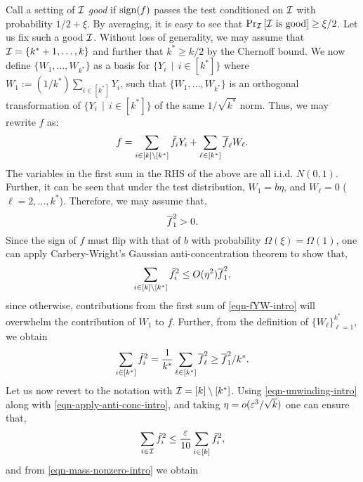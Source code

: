 Call a setting of $\mathcal{I}$ \emph{good} if $\textnormal{sign}(f)$ passes the test
conditioned on $\mathcal{I}$ with probability $1/2 + \xi$. By averaging,
it is easy to see that $\Pr_{\mathcal{I}}\left[\mathcal{I}\textnormal{ is good}\right] \geq
\xi/2$.  Let us fix such a good
$\mathcal{I}$. Without loss of generality, we may assume that $\mathcal{I} = \{k^* + 1, \dots, k\}$ and
further that $k^* \geq k/2$ by the Chernoff bound. We now define 
 $\{W_1, \dots, W_{k^*}\}$ as a basis for $\{Y_{i}\,\mid\,i \in [k^*]\}$
where $W_1 := (1/k^*)\sum_{i\in[k^*]} Y_{i}$, 
such that $\{W_1, \dots, W_{k^*}\}$ is an orthogonal
transformation of $\{Y_{i}\,\mid\,i \in [k^*]\}$ of the same $1/\sqrt{k^*}$ 
norm. 
Thus, we may rewrite $f$ as:
\begin{equation}\label{eqn-fYW-intro}
f = \sum_{i \in
[k]\setminus[k^*]}\tilde{f}_{i}Y_{i} + \sum_{\ell \in [k^*]}
\overline{f}_{\ell}W_\ell.
\end{equation} The variables in the first sum in the RHS of the
above are all i.i.d. $N(0,1)$. Further, it can be seen that under the
test distribution, $W_1 = b\eta$, and $W_\ell = 0$ ($\ell
= 2,\dots, k^*$). Therefore, we may assume that,
\begin{equation}
\overline{f}_1^2 > 0.\label{eqn-mass-nonzero-intro}
\end{equation}
Since the sign of $f$ must flip with that of $b$
with probability $\Omega(\xi) = \Omega(1)$, one can apply
Carbery-Wright's Gaussian
anti-concentration theorem to show that,
\begin{equation}\label{eqn-apply-anti-conc-intro}
\sum_{i \in
[k]\setminus[k^*]}\tilde{f}_{i}^2 \leq O(\eta^2)\overline{f}^2_{1}, 
\end{equation}
since otherwise, contributions from the first sum of \eqref{eqn-fYW-intro}  will 
overwhelm the contribution of $W_1$ to $f$.
Further, from the definition of $\{W_\ell\}_{\ell=1}^{k^*}$, we obtain
\begin{equation}
\sum_{i \in [k^*]}\tilde{f}_{i}^2 = \frac{1}{k^*}\sum_{\ell \in [k^*]}
\overline{f}_{\ell}^2 \geq  \overline{f}_1^2/k^*. \label{eqn-unwinding-intro}
\end{equation}
Let us now revert to the notation with $\mathcal{I} = [k]\setminus[k^*]$. 
Using   \eqref{eqn-unwinding-intro} along with   \eqref{eqn-apply-anti-conc-intro},
and taking $\eta = o(\varepsilon^3/\sqrt{k})$ one can ensure that,
\begin{equation}
\sum_{i \in \mathcal{I}}\tilde{f}_{i}^2 \leq
\frac{\varepsilon}{10}\sum_{i \in [k]}\tilde{f}_{i}^2,
\label{eqn-1-bound-intro}
\end{equation}
and from   \eqref{eqn-mass-nonzero-intro} we obtain
